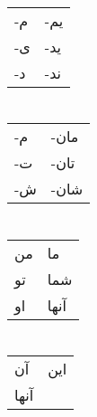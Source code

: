 \documentclass[landscape]{article}
\newcommand\ه{\hline}
\begin{document}
\begin{multicols}{3}
	\section*{}
	\begin{tabularx}{\columnwidth}{Y|Y}
	-م & -یم\\
	-ی & -ید\\
	-د & -ند
    \end{tabularx}
    
    \section*{}
    \begin{tabularx}{\columnwidth}{Y|Y}
	-م & -مان\\
    -ت & -تان\\
    -ش & -شان
    \end{tabularx}
    
    \section*{}
    \begin{tabularx}{\columnwidth}{Y|Y}
	من & ما\\
    	تو & شما\\
    	او & آنها
    \end{tabularx}
    
    \section*{}
    \begin{tabularx}{\columnwidth}{Y|Y}
   	آن & این\\
    	آنها &\\
    \end{tabularx}
\end{multicols}
\end{document}
